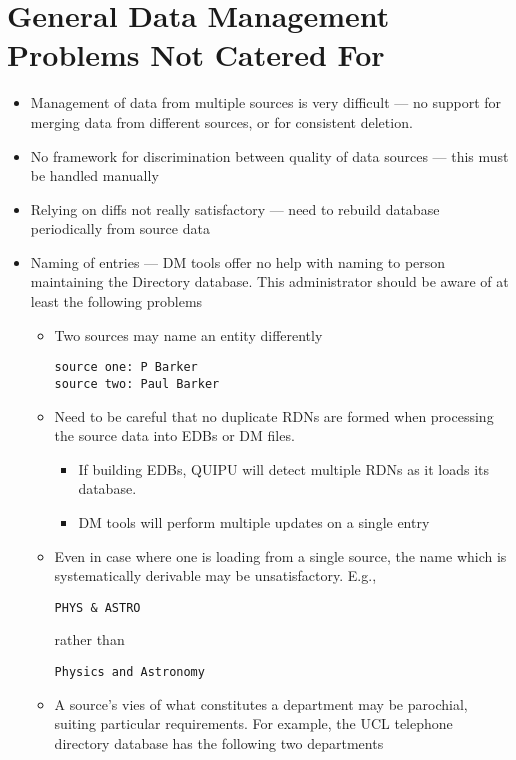 \section {General Data Management Problems Not Catered For}

\begin{itemize}
\item Management of data from multiple sources is very difficult --- no support
for merging data from different sources, or for consistent deletion.
\item No framework for discrimination between quality of data sources --- this
must be handled manually
\item Relying on diffs not really satisfactory --- need to rebuild database
periodically from source data
\item Naming of entries --- DM tools offer no help with naming to person
maintaining the Directory
database.  This administrator should be aware of at least the following
problems
\begin{itemize}
\item Two sources may name an entity differently

\begin{verbatim}
source one: P Barker
source two: Paul Barker
\end{verbatim}

\item Need to be careful that no duplicate RDNs are formed when processing
the source data into EDBs or DM files.
\begin{itemize}
\item If building EDBs, QUIPU will detect multiple RDNs as it loads its
database.
\item DM tools will perform multiple updates on a single entry
\end{itemize}

\item Even in case where one is loading from a single source, the name which
is systematically derivable may be unsatisfactory. E.g.,

\verb|PHYS & ASTRO|

rather than

\verb|Physics and Astronomy|

\item A source's vies of what constitutes a department may be parochial,
suiting particular requirements.  For example, the UCL telephone directory
database has the following two departments


\end{itemize}
\end{itemize}
